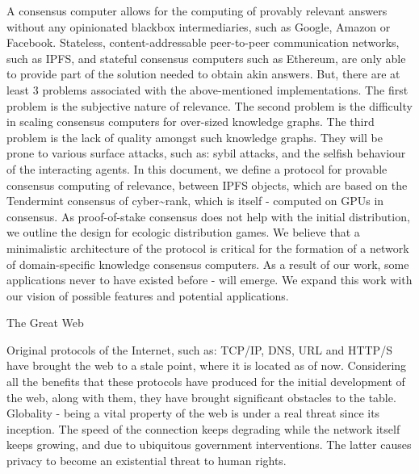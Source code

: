 \documentclass[8pt,oneside]{amsart}
\title{\fontsize{16}{17}\selectfont\textnormal{\MakeLowercase{\play{cyber: \uppercase{C}omputing the knowledge of the \uppercase{G}reat \uppercase{W}eb}}}}
\author{\fontsize{8}{9}\selectfont{
    \MakeLowercase{
    @xhipster \& @litvintech as of \today
    }
  }
}
\makeatletter
\renewcommand\subsection{\@startsection{subsection}
                                    {2}{\z@}
                                    {-3.25ex\@plus -1ex \@minus -.2ex}
                                    {0ex \@plus .2ex}
                                    {\play\Large}
                        }
\newcommand{\titleSection}[1]{\subsection{#1}}
\newenvironment{Figure}
  {\par\medskip\noindent\minipage{\linewidth}}
  {\endminipage\par\medskip}
\providecommand\abstractname{Abstract}
\renewenvironment{abstract}{%
  \centering\normalfont
  \list{}{\leftmargin2.1cm \rightmargin\leftmargin}
  {\par\noindent{\normalfont\abstractname.}}
  \item\relax
}{

  \endlist \par\bigskip
}
\makeatother
\begin{document}
\maketitle
\selectfont
\raggedbottom
\justifying

\vspace{-3em}{
\begin{Figure}
\medskip
\centering
\texttt{[image: graph.png]}
\medskip
\end{Figure}
}

\begin{abstract}
A consensus computer allows for the computing of provably relevant answers without any opinionated blackbox intermediaries, such as Google, Amazon or Facebook. Stateless, content-addressable peer-to-peer communication networks, such as IPFS, and stateful consensus computers such as Ethereum, are only able to provide part of the solution needed to obtain akin answers. But, there are at least 3 problems associated with the above-mentioned implementations. The first problem is the subjective nature of relevance. The second problem is the difficulty in scaling consensus computers for over-sized knowledge graphs. The third problem is the lack of quality amongst such knowledge graphs. They will be prone to various surface attacks, such as: sybil attacks, and the selfish behaviour of the interacting agents. In this document, we define a protocol for provable consensus computing of relevance, between IPFS objects, which are based on the Tendermint consensus of cyber\~{}rank, which is itself - computed on GPUs in consensus. As proof-of-stake consensus does not help with the initial distribution, we outline the design for ecologic distribution games. We believe that a minimalistic architecture of the protocol is critical for the formation of a network of domain-specific knowledge consensus computers. As a result of our work, some applications never to have existed before - will emerge. We expand this work with our vision of possible features and potential applications.
\end{abstract}

\titleSection{The Great Web}\label{great-web}

Original protocols of the Internet, such as: TCP/IP, DNS, URL and HTTP/S have brought the web to a stale point, where it is located as of now. Considering all the benefits that these protocols have produced for the initial development of the web, along with them, they have brought significant obstacles to the table. Globality - being a vital property of the web is under a real threat since its inception. The speed of the connection keeps degrading while the network itself keeps growing, and due to ubiquitous government interventions. The latter causes privacy to become an existential threat to human rights.
\end{document}
